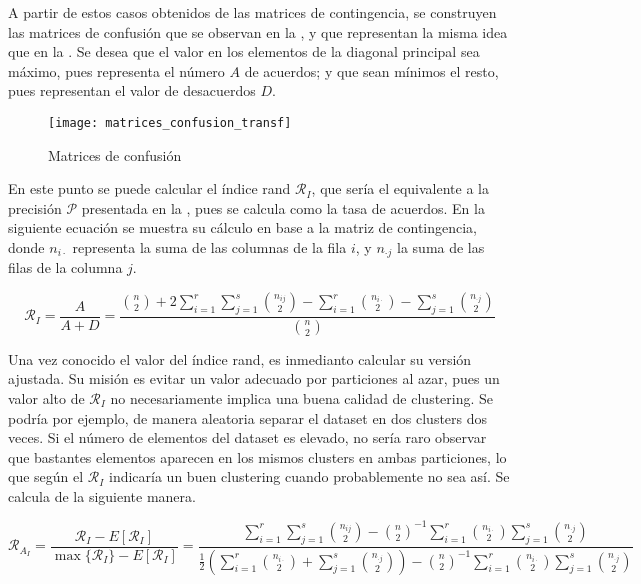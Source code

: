 					A partir de estos casos obtenidos de las matrices de contingencia, se construyen las matrices de confusión que se observan en la , y que representan la misma idea que en la . Se desea que el valor en los elementos de la diagonal principal sea máximo, pues representa el número $A$ de acuerdos; y que sean mínimos el resto, pues representan el valor de desacuerdos $D$. 
					
					\begin{figure}[!h]
						\centering
						\texttt{[image: matrices\_confusion\_transf]}
						\caption{Matrices de confusión}
						\label{fig:matrices_confusion_transf}
					\end{figure} 
					
					En este punto se puede calcular el índice rand $\mathcal{R}_I$, que sería el equivalente a la precisión $\mathcal{P}$ presentada en la , pues se calcula como la tasa de acuerdos. En la siguiente ecuación se muestra su cálculo en base a la matriz de contingencia, donde $n_{i\cdot}$ representa la suma de las columnas de la fila $i$, y $n_{\cdot j}$ la suma de las filas de la columna $j$. 
					
					$$
					\mathcal{R}_I = \frac{A}{A + D} = \frac{\displaystyle\binom{n}{2} + 2\sum_{i = 1}^r\sum_{j = 1}^s \binom{n_{ij}}{2} - \sum_{i = 1}^r \binom{n_{i\cdot}}{2} - \sum_{j = 1}^s \binom{n_{\cdot j}}{2}}{\displaystyle\binom{n}{2}}
					$$
					
					Una vez conocido el valor del índice rand, es inmedianto calcular su versión ajustada. Su misión es evitar un valor adecuado por particiones al azar, pues un valor alto de $\mathcal{R}_I$ no necesariamente implica una buena calidad de clustering. Se podría por ejemplo, de manera aleatoria separar el dataset en dos clusters dos veces. Si el número de elementos del dataset es elevado, no sería raro observar que bastantes elementos aparecen en los mismos clusters en ambas particiones, lo que según el $\mathcal{R}_I$ indicaría un buen clustering cuando probablemente no sea así. Se calcula de la siguiente manera. 
					
					$$
					\mathcal{R}_{A_I} = \frac{\mathcal{R}_{I} - E[\mathcal{R}_I]}{\max\{\mathcal{R}_I\} - E[\mathcal{R}_I]} = \frac{\displaystyle\sum_{i = 1}^r\sum_{j = 1}^s\binom{n_{ij}}{2} - \binom{n}{2}^{-1}\sum_{i = 1}^r\binom{n_{i\cdot}}{2}\sum_{j = 1}^s\binom{n_{\cdot j}}{2}}{\displaystyle\frac{1}{2}\left(\sum_{i = 1}^r \binom{n_{i\cdot}}{2} + \sum_{j = 1}^s \binom{n_{\cdot j}}{2}\right) - \binom{n}{2}^{-1}\sum_{i = 1}^r\binom{n_{i\cdot}}{2}\sum_{j = 1}^s\binom{n_{\cdot j}}{2}}
					$$
					
